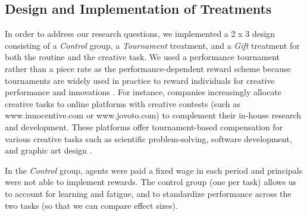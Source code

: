 

\subsection{Design and Implementation of Treatments}




In order to address our research questions,
we implemented a 2 x 3 design consisting of a \textit{Control} group, a \textit{Tournament} treatment, and
a \textit{Gift} treatment for both the routine and the creative task. We used a performance tournament rather than a 
piece rate as the performance-dependent reward scheme   because tournaments 
are widely used in practice  to reward individuals for creative performance and innovations \citep{Brunt2012,Kremer2010}. 
For instance, companies increasingly allocate creative tasks to online platforms with creative 
contests (such as www.innocentive.com or www.jovoto.com) to complement their 
in-house research and development. These platforms offer tournament-based 
compensation for various creative tasks such as scientific problem-solving, 
software development, and graphic art design \citep{Boudreau2011}.  


In the \textit{Control} group, agents were paid a fixed wage in each period and 
 principals were not able to implement  rewards. The control group (one per task)
allows us to account for learning 
and fatigue, and to standardize performance across the two tasks (so that we can compare effect sizes). 

